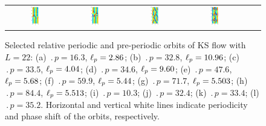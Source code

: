 \begin{figure}[t]
\begin{center}
\begin{tabular}{cccccc}
\includegraphics[width=0.15\textwidth, clip=true]{figs/ks22rpo059.9-05.44.eps}\hspace{-3ex} &
\includegraphics[width=0.15\textwidth, clip=true]{figs/ks22rpo084.4-05.51.eps}\hspace{-3ex} &
\includegraphics[width=0.15\textwidth, clip=true]{figs/ks22rpo064.7-00.00.eps}\hspace{-3ex} &
\includegraphics[width=0.15\textwidth, clip=true]{figs/ks22rpo070.3-00.00.eps}
\end{tabular}
\end{center}
\caption{Selected relative periodic and
pre-periodic
orbits of KS flow with $L = 22$:
(a) $\period{p} = 16.3$, $\ell_p = 2.86$;
(b) $\period{p} = 32.8$, $\ell_p = 10.96$;
(c) $\period{p} = 33.5$, $\ell_p = 4.04$;
(d) $\period{p} = 34.6$, $\ell_p = 9.60$;
(e) $\period{p} = 47.6$, $\ell_p = 5.68$;
(f) $\period{p} = 59.9$, $\ell_p = 5.44$;
(g) $\period{p} = 71.7$, $\ell_p = 5.503$;
(h) $\period{p} = 84.4$, $\ell_p = 5.513$;
(i) $\period{p} = 10.3$;
(j) $\period{p} = 32.4$;
(k) $\period{p} = 33.4$;
(l) $\period{p} = 35.2$.
Horizontal and vertical white lines indicate periodicity and phase
shift of the orbits, respectively.
}\label{f:ks22rpos}
\end{figure}
